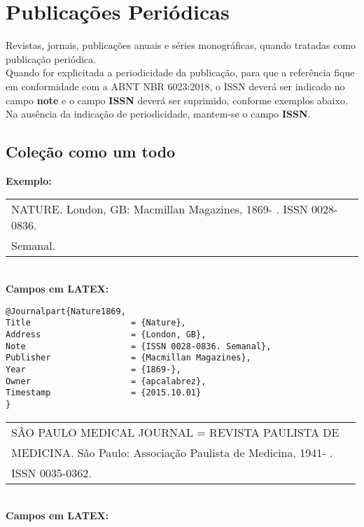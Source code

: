 \section{Publicações Periódicas}

Revistas, jornais, publicações anuais e s\'eries monogr\'aficas, quando
tratadas como publicação periódica. \\

Quando for explicitada a periodicidade da publicação, para que a refer\^encia fique em conformidade com a ABNT NBR 6023:2018, o ISSN dever\'a ser indicado no campo \textbf{note} e o campo \textbf{ISSN} dever\'a ser suprimido, conforme exemplos abaixo. Na aus\^encia da indicação de periodicidade, mantem-se o campo \textbf{ISSN}. \\

\subsection{Coleção como um todo}

\textbf{Exemplo:} \\

\begin{tabular}{|l|c|} \hline
	NATURE. London, GB: Macmillan Magazines, 1869- . ISSN
	0028-0836.\\Semanal.\\\hline
\end{tabular} \\

\textbf{Campos em LATEX:} 

\begin{verbatim}
@Journalpart{Nature1869,
Title                    = {Nature},
Address                  = {London, GB},
Note                     = {ISSN 0028-0836. Semanal},
Publisher                = {Macmillan Magazines},
Year                     = {1869-},
Owner                    = {apcalabrez},
Timestamp                = {2015.10.01}
}
\end{verbatim}

\begin{tabular}{|l|c|} \hline
	SÃO PAULO MEDICAL JOURNAL = REVISTA PAULISTA DE\\MEDICINA.  São Paulo: Associação Paulista de Medicina, 1941- . \\ISSN 0035-0362.\\\hline
\end{tabular} \\

\textbf{Campos em LATEX:} 

